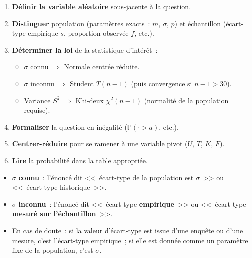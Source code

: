 \documentclass[11pt,a4paper]{article}
\newcommand{\Prob}{\mathbb{P}}
\renewcommand{\P}{\Prob}
\begin{document}
\begin{methbox}
\begin{enumerate}
  \item \textbf{D\'efinir la variable al\'eatoire} sous-jacente \`a la question.
  \item \textbf{Distinguer} population (param\`etres exacts~: $m$, $\sigma$, $p$) et \'echantillon (\'ecart-type empirique $s$, proportion observ\'ee $f$, etc.).
  \item \textbf{D\'eterminer la loi} de la statistique d'int\'er\^et~:
    \begin{itemize}
      \item $\sigma$ connu $\Rightarrow$ Normale centr\'ee r\'eduite.
      \item $\sigma$ inconnu $\Rightarrow$ Student $T(n-1)$ (puis convergence si $n-1>30$).
      \item Variance $S^2$ $\Rightarrow$ Khi-deux $\chi^2(n-1)$ (normalit\'e de la population requise).
    \end{itemize}
  \item \textbf{Formaliser} la question en in\'egalit\'e ($\P(\cdot > a)$, etc.).
  \item \textbf{Centrer-r\'eduire} pour se ramener \`a une variable pivot ($U$, $T$, $K$, $F$).
  \item \textbf{Lire} la probabilit\'e dans la table appropri\'ee.
\end{enumerate}
\end{methbox}

\begin{methbox}
\begin{itemize}
  \item $\sigma$ \textbf{connu}~: l'\'enonc\'e dit <<~\'ecart-type de la population est $\sigma$~>> ou <<~\'ecart-type historique~>>.
  \item $\sigma$ \textbf{inconnu}~: l'\'enonc\'e dit <<~\'ecart-type \textbf{empirique}~>> ou <<~\'ecart-type \textbf{mesur\'e sur l'\'echantillon}~>>.
  \item En cas de doute~: si la valeur d'\'ecart-type est issue d'une enqu\^ete ou d'une mesure, c'est l'\'ecart-type empirique~; si elle est donn\'ee comme un param\`etre fixe de la population, c'est $\sigma$.
\end{itemize}
\end{methbox}
\end{document}
